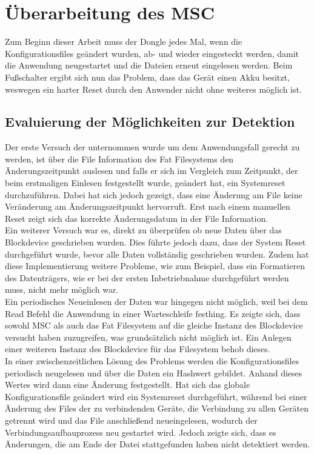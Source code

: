 \section{Überarbeitung des MSC}
Zum Beginn dieser Arbeit muss der Dongle jedes Mal, wenn die Konfigurationsfiles geändert wurden, ab- und wieder eingesteckt werden, damit die Anwendung neugestartet und die Dateien erneut eingelesen werden. Beim Fußschalter ergibt sich nun das Problem, dass das Gerät einen Akku besitzt, weswegen ein harter Reset durch den Anwender nicht ohne weiteres möglich ist.

\subsection{Evaluierung der Möglichkeiten zur Detektion}
Der erste Versuch der unternommen wurde um dem Anwendungsfall gerecht zu werden, ist über die File Information des Fat Filesystems den Änderungszeitpunkt auslesen und falls er sich im Vergleich zum Zeitpunkt, der beim erstmaligen Einlesen festgestellt wurde, geändert hat, ein Systemreset durchzuführen. Dabei hat sich jedoch gezeigt, dass eine Änderung am File keine Veränderung am Änderungszeitpunkt hervorruft. Erst nach einem manuellen Reset zeigt sich das korrekte Änderungsdatum in der File Information. \\
Ein weiterer Versuch war es, direkt zu überprüfen ob neue Daten über das Blockdevice geschrieben wurden. Dies führte jedoch dazu, dass der System Reset durchgeführt wurde, bevor alle Daten vollständig geschrieben wurden. Zudem hat diese Implementierung weitere Probleme, wie zum Beispiel, dass ein Formatieren des Datenträgers, wie er bei der ersten Inbetriebnahme durchgeführt werden muss, nicht mehr möglich war. \\
Ein periodisches Neueinlesen der Daten war hingegen nicht möglich, weil bei dem Read Befehl die Anwendung in einer Warteschleife festhing. Es zeigte sich, dass sowohl MSC als auch das Fat Filesystem auf die gleiche Instanz des Blockdevice versucht haben zuzugreifen, was grundsätzlich nicht möglich ist. Ein Anlegen einer weiteren Instanz des Blockdevice für das Filesystem behob dieses. \\
In einer zwischenzeitlichen Lösung des Problems werden die Konfigurationsfiles periodisch neugelesen und über die Daten ein Hashwert gebildet. Anhand dieses Wertes wird dann eine Änderung festgestellt. Hat sich das globale Konfigurationsfile geändert wird ein Systemreset durchgeführt, während bei einer Änderung des Files der zu verbindenden Geräte, die Verbindung zu allen Geräten getrennt wird und das File anschließend neueingelesen, wodurch der Verbindungsaufbauprozess neu gestartet wird. Jedoch zeigte sich, dass es Änderungen, die am Ende der Datei stattgefunden haben nicht detektiert werden.

